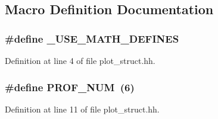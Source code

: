 \subsection{Macro Definition Documentation}
\hypertarget{plot__struct_8hh_a525335710b53cb064ca56b936120431e}{
\subsubsection[{\+\_\+\+U\+S\+E\+\_\+\+M\+A\+T\+H\+\_\+\+D\+E\+F\+I\+N\+E\+S}]{\setlength{\rightskip}{0pt plus 5cm}\#define \+\_\+\+U\+S\+E\+\_\+\+M\+A\+T\+H\+\_\+\+D\+E\+F\+I\+N\+E\+S}}\label{plot__struct_8hh_a525335710b53cb064ca56b936120431e}


Definition at line 4 of file plot\+\_\+struct.\+hh.

\hypertarget{plot__struct_8hh_a2157e7b8a768152a4baebc430cdbe941}{
\subsubsection[{P\+R\+O\+F\+\_\+\+N\+U\+M}]{\setlength{\rightskip}{0pt plus 5cm}\#define P\+R\+O\+F\+\_\+\+N\+U\+M~(6)}}\label{plot__struct_8hh_a2157e7b8a768152a4baebc430cdbe941}


Definition at line 11 of file plot\+\_\+struct.\+hh.


